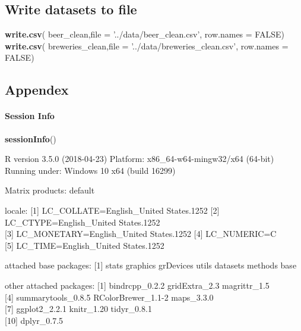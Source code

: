\documentclass[]{article}
\newenvironment{Shaded}{\begin{snugshade}}{\end{snugshade}}
\newcommand{\KeywordTok}[1]{\textcolor[rgb]{0.13,0.29,0.53}{\textbf{#1}}}
\newcommand{\DataTypeTok}[1]{\textcolor[rgb]{0.13,0.29,0.53}{#1}}
\newcommand{\StringTok}[1]{\textcolor[rgb]{0.31,0.60,0.02}{#1}}
\newcommand{\OtherTok}[1]{\textcolor[rgb]{0.56,0.35,0.01}{#1}}
\newcommand{\NormalTok}[1]{#1}
\let\oldparagraph\paragraph
\renewcommand{\paragraph}[1]{\oldparagraph{#1}\mbox{}}
\begin{document}
\subsection{Write datasets to file}\label{write-datasets-to-file}

\begin{Shaded}
\begin{Highlighting}[]
\KeywordTok{write.csv}\NormalTok{( beer_clean,}\DataTypeTok{file =} \StringTok{'../data/beer_clean.csv'}\NormalTok{, }\DataTypeTok{row.names =} \OtherTok{FALSE}\NormalTok{)}
\KeywordTok{write.csv}\NormalTok{( breweries_clean,}\DataTypeTok{file =} \StringTok{'../data/breweries_clean.csv'}\NormalTok{, }\DataTypeTok{row.names =} \OtherTok{FALSE}\NormalTok{)}
\end{Highlighting}
\end{Shaded}

\subsection{Appendex}\label{appendex}

\paragraph{Session Info}\label{session-info}

\begin{Shaded}
\begin{Highlighting}[]
\KeywordTok{sessionInfo}\NormalTok{()}
\end{Highlighting}
\end{Shaded}

R version 3.5.0 (2018-04-23) Platform: x86\_64-w64-mingw32/x64 (64-bit)
Running under: Windows 10 x64 (build 16299)

Matrix products: default

locale: {[}1{]} LC\_COLLATE=English\_United States.1252 {[}2{]}
LC\_CTYPE=English\_United States.1252\\
{[}3{]} LC\_MONETARY=English\_United States.1252 {[}4{]} LC\_NUMERIC=C\\
{[}5{]} LC\_TIME=English\_United States.1252

attached base packages: {[}1{]} stats graphics grDevices utils datasets
methods base

other attached packages: {[}1{]} bindrcpp\_0.2.2 gridExtra\_2.3
magrittr\_1.5\\
{[}4{]} summarytools\_0.8.5 RColorBrewer\_1.1-2 maps\_3.3.0\\
{[}7{]} ggplot2\_2.2.1 knitr\_1.20 tidyr\_0.8.1\\
{[}10{]} dplyr\_0.7.5
\end{document}
